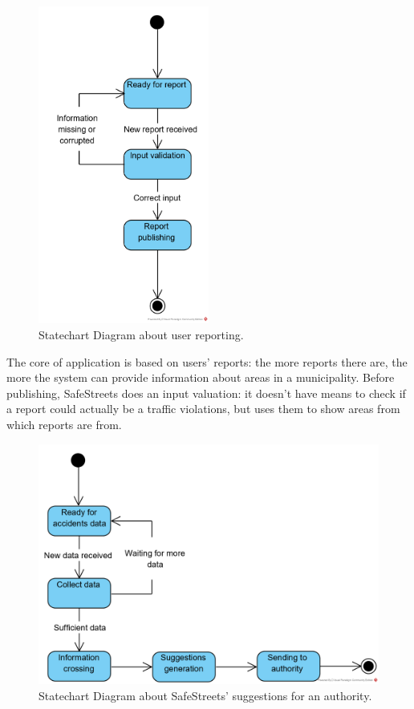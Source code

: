 \documentclass{article}
\begin{document}
	\begin{figure}[H]
		\centering
		\includegraphics[width=0.5\textwidth]{diagrams/statechart_UserSS.png}
		\caption[Statechart Diagram1]{Statechart Diagram about user reporting.}
		\label{fig:statechart_userReporting}
	\end{figure}
	
	The core of application is based on users' reports: the more reports there are, the more the system can provide information about areas in a municipality. Before publishing, SafeStreets does an input valuation: it doesn't have means to check if a report could actually be a traffic violations, but uses them to show areas from which reports are from.
	
	\begin{figure}[H]
		\centering
		\includegraphics {diagrams/statechart_AuthoritySS.png}
		\caption[Statechart Diagram2]{Statechart Diagram about SafeStreets' suggestions for an authority.}
		\label{fig:statechart_SuggestionsForAuthority}
	\end{figure}
	
\end{document}
